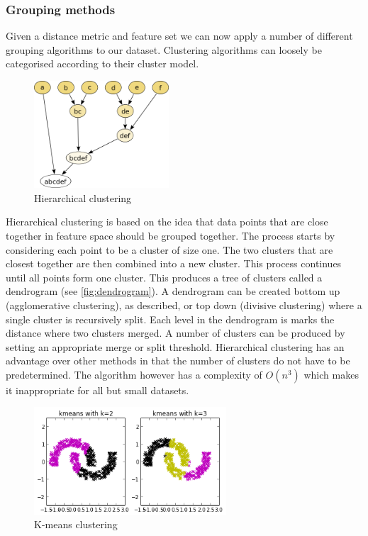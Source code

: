 \subsubsection*{Grouping methods}

Given a distance metric and feature set we can now apply a number of different grouping algorithms to our dataset. Clustering algorithms can loosely be categorised according to their cluster model.

\begin{figure}
\centering
\includegraphics[height=4cm]{images/hierarchical-clustering}
\caption[Hierarchical clustering]{Hierarchical clustering}\label{fig:dendrogram}
\end{figure}



Hierarchical clustering is based on the idea that data points that are close together in feature space should be grouped together. The process starts by considering each point to be a cluster of size one. The two clusters that are closest together are then combined into a new cluster. This process continues until all points form one cluster. This produces a tree of clusters called a dendrogram (see \autoref{fig:dendrogram}). A dendrogram can be created bottom up (agglomerative clustering), as described, or top down (divisive clustering) where a single cluster is recursively split. Each level in the dendrogram is marks the distance where two clusters merged. A number of clusters can be produced by setting an appropriate merge or split threshold. Hierarchical clustering has an advantage over other methods in that the number of clusters do not have to be predetermined. The algorithm however has a complexity of $O(n^3)$ which makes it inappropriate for all but small datasets.

\begin{figure}
\centering
\includegraphics[height=4cm]{images/kmeans}
\caption[Hierarchical clustering]{K-means clustering \protect\footnotemark}\label{fig:kmeans}
\end{figure}

